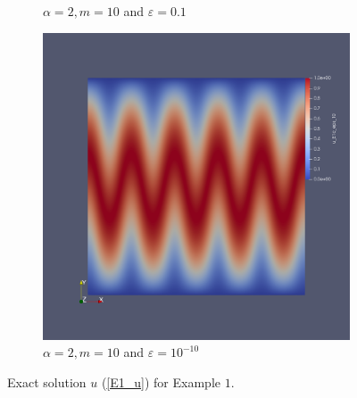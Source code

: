 \documentclass[12pt,a4paper]{article}
\begin{document}
\begin{figure}[H]
\begin{subfigure}{0.44\textwidth}
     \caption{$\alpha=2, m=10$ and $\varepsilon = 0.1$}
 \end{subfigure}
 \hfill
 \begin{subfigure}{0.44\textwidth}
     \includegraphics[width=\textwidth]{Pics/uf/u_E1c_eps_10.png}
     \caption{$\alpha=2, m=10$ and $\varepsilon = 10^{-10}$}
 \end{subfigure}
 \caption{Exact solution $u$ (\ref{E1_u}) for Example $1$.} \label{E1_us}
\end{figure}
\end{document}
